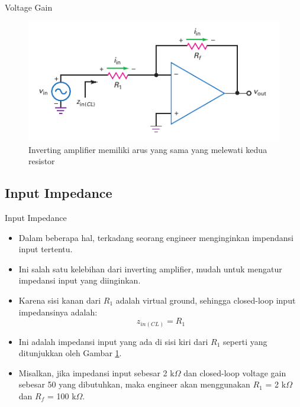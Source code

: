 \begin{frame}[t]{Voltage Gain}
	\begin{figure}
		\centering
		\includegraphics[height=0.4\textheight]{gambar/fig-16.14}
		\caption{Inverting amplifier memiliki arus yang sama yang melewati kedua resistor}
		\label{fig-16.14}
	\end{figure}
\end{frame}

\subsection{Input Impedance}

\begin{frame}[t]{Input Impedance}
	\begin{itemize}
		\item Dalam beberapa hal, terkadang seorang engineer menginginkan impendansi input tertentu.
		\item Ini salah satu kelebihan dari inverting amplifier, mudah untuk mengatur impedansi input yang diinginkan.
		\item Karena sisi kanan dari $ R_1 $ adalah virtual ground, sehingga closed-loop input impedansinya adalah:\\

		\begin{equation}\label{pers.16.04}
			z_{in(CL)} = R_1
		\end{equation}

		\item Ini adalah impedansi input yang ada di sisi kiri dari $ R_1 $ seperti yang ditunjukkan oleh Gambar \ref{fig-16.14}.
		\item Misalkan, jika impedansi input sebesar 2 k$\Omega$ dan closed-loop voltage gain sebesar 50 yang dibutuhkan, maka engineer akan menggunakan $ R_1 $ = 2 k$\Omega$ dan $ R_f $ = 100 k$\Omega$.
	\end{itemize}
\end{frame}

